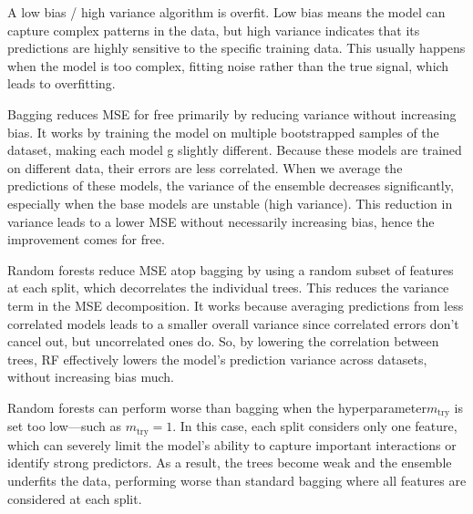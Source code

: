 \documentclass[12pt]{article}
\begin{document}
\begin{enumerate}
A low bias / high variance algorithm is overfit. Low bias means the model can capture complex patterns in the data, but high variance indicates that its predictions are highly sensitive to the specific training data. This usually happens when the model is too complex, fitting noise rather than the true signal, which leads to overfitting.


Bagging reduces MSE for free primarily by reducing variance without increasing bias. It works by training the model on multiple bootstrapped samples of the dataset, making each model g slightly different. Because these models are trained on different data, their errors are less correlated. When we average the predictions of these models, the variance of the ensemble decreases significantly, especially when the base models are unstable (high variance). This reduction in variance leads to a lower MSE without necessarily increasing bias, hence the improvement comes for free.


Random forests reduce MSE atop bagging by using a random subset of features at each split, which decorrelates the individual trees. This reduces the variance term in the MSE decomposition. It works because averaging predictions from less correlated models leads to a smaller overall variance since correlated errors don’t cancel out, but uncorrelated ones do. So, by lowering the correlation between trees, RF effectively lowers the model’s prediction variance across datasets, without increasing bias much.


Random forests can perform worse than bagging when the hyperparameter$ m_{\text{try}}$ is set too low—such as $m_{\text{try}} = 1$.
In this case, each split considers only one feature, which can severely limit the model’s ability to capture important interactions or  identify strong predictors. As a result, the trees become weak and the ensemble underfits the data, performing worse than standard bagging where all features are considered at each split.

\end{enumerate}
\end{document}
